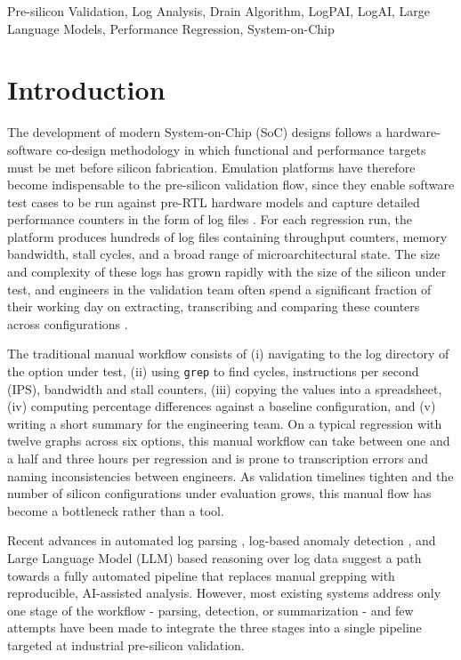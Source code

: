 \documentclass[conference]{IEEEtran}
\begin{document}
\begin{IEEEkeywords}
Pre-silicon Validation, Log Analysis, Drain Algorithm, LogPAI, LogAI, Large Language Models, Performance Regression, System-on-Chip
\end{IEEEkeywords}

\section{Introduction}

The development of modern System-on-Chip (SoC) designs follows a hardware-software co-design methodology in which functional and performance targets must be met before silicon fabrication. Emulation platforms have therefore become indispensable to the pre-silicon validation flow, since they enable software test cases to be run against pre-RTL hardware models and capture detailed performance counters in the form of log files \cite{lai2018emulation, deltombe2014emulation}. For each regression run, the platform produces hundreds of log files containing throughput counters, memory bandwidth, stall cycles, and a broad range of microarchitectural state. The size and complexity of these logs has grown rapidly with the size of the silicon under test, and engineers in the validation team often spend a significant fraction of their working day on extracting, transcribing and comparing these counters across configurations \cite{he2021survey}.

The traditional manual workflow consists of (i) navigating to the log directory of the option under test, (ii) using \texttt{grep} to find cycles, instructions per second (IPS), bandwidth and stall counters, (iii) copying the values into a spreadsheet, (iv) computing percentage differences against a baseline configuration, and (v) writing a short summary for the engineering team. On a typical regression with twelve graphs across six options, this manual workflow can take between one and a half and three hours per regression and is prone to transcription errors and naming inconsistencies between engineers. As validation timelines tighten and the number of silicon configurations under evaluation grows, this manual flow has become a bottleneck rather than a tool.

Recent advances in automated log parsing \cite{he2017drain, zhu2019tools, du2016spell}, log-based anomaly detection \cite{du2017deeplog, zhang2019logrobust, guo2021logbert}, and Large Language Model (LLM) based reasoning over log data \cite{le2023logprompt, liu2024logprompt, ahmed2023recommending} suggest a path towards a fully automated pipeline that replaces manual grepping with reproducible, AI-assisted analysis. However, most existing systems address only one stage of the workflow - parsing, detection, or summarization - and few attempts have been made to integrate the three stages into a single pipeline targeted at industrial pre-silicon validation.
\end{document}
